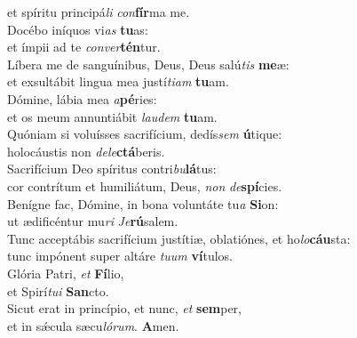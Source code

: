 \oddverse et spíritu principá\textit{li} \textit{con}\textbf{fír}ma me.\\
\evenverse Docébo iníquos vi\textit{as} \textbf{tu}as:~\*\\
\evenverse et ímpii ad te \textit{con}\textit{ver}\textbf{tén}tur.\\
\oddverse Líbera me de sanguínibus, Deus, Deus salú\textit{tis} \textbf{me}æ:~\*\\
\oddverse et exsultábit lingua mea justí\textit{ti}\textit{am} \textbf{tu}am.\\
\evenverse Dómine, lábia mea \textit{a}\textbf{pé}ries:~\*\\
\evenverse et os meum annuntiábit \textit{lau}\textit{dem} \textbf{tu}am.\\
\oddverse Quóniam si voluísses sacrifícium, dedís\textit{sem} \textbf{ú}tique:~\*\\
\oddverse holocáustis non \textit{de}\textit{le}\textbf{ctá}beris.\\
\evenverse Sacrifícium Deo spíritus contri\textit{bu}\textbf{lá}tus:~\*\\
\evenverse cor contrítum et humiliátum, Deus, \textit{non} \textit{de}\textbf{spí}cies.\\
\oddverse Benígne fac, Dómine, in bona voluntáte tu\textit{a} \textbf{Si}on:~\*\\
\oddverse ut ædificéntur mu\textit{ri} \textit{Je}\textbf{rú}salem.\\
\evenverse Tunc acceptábis sacrifícium justítiæ, oblatiónes, et ho\textit{lo}\textbf{cáu}sta:~\*\\
\evenverse tunc impónent super altáre \textit{tu}\textit{um} \textbf{ví}tulos.\\
\oddverse Glória Patri, \textit{et} \textbf{Fí}lio,~\*\\
\oddverse et Spirí\textit{tu}\textit{i} \textbf{San}cto.\\
\evenverse Sicut erat in princípio, et nunc, \textit{et} \textbf{sem}per,~\*\\
\evenverse et in sǽcula sæcu\textit{ló}\textit{rum}. \textbf{A}men.\\
